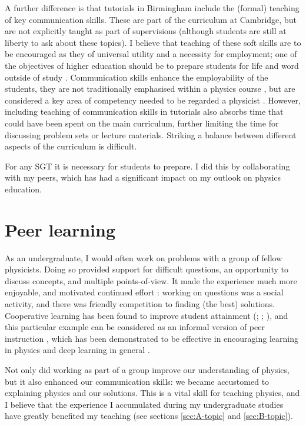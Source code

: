 A further difference is that tutorials in Birmingham include the (formal) teaching of key communication skills. These are part of the curriculum at Cambridge, but are not explicitly taught as part of supervisions (although students are still at liberty to ask about these topics). I believe that teaching of these soft skills are to be encouraged as they of universal utility and a necessity for employment; one of the objectives of higher education should be to prepare students for life and word outside of study \citep{Fallows2000,Harvey2000}. Communication skills enhance the employability of the students, they are not traditionally emphasised within a physics course \citep[cf.][]{Sharma2007}, but are considered a key area of competency needed to be regarded a physicist \citep{Gonsalves2014a}. However, including teaching of communication skills in tutorials also absorbs time that could have been spent on the main curriculum, further limiting the time for discussing problem sets or lecture materials. Striking a balance between different aspects of the curriculum is difficult.

For any SGT it is necessary for students to prepare. I did this by collaborating with my peers, which has had a significant impact on my outlook on physics education.

\section{Peer learning}\label{sec:peer}

As an undergraduate, I would often work on problems with a group of fellow physicists. Doing so provided support for difficult questions, an opportunity to discuss concepts, and multiple points-of-view. It made the experience much more enjoyable, and motivated continued effort \citep[e.g.,][chapter 1]{Roth1994,Springer1999,Falchikov2001}: working on questions was a social activity, and there was friendly competition to finding (the best) solutions. Cooperative learning has been found to improve student attainment (\citealt{Qin1995}; \citealt[chapter 2]{Falchikov2001}; \citealt{Cabrera2002}), and this particular example can be considered as an informal version of peer instruction \citep{Roth1994}, which has been demonstrated to be effective in encouraging learning in physics \citep{Springer1999,Crouch2001,Pilzer2001,Miller2006} and deep learning in general \citep{Marton1976,Wilson2010}.

Not only did working as part of a group improve our understanding of physics, but it also enhanced our communication skills: we became accustomed to explaining physics and our solutions. This is a vital skill for teaching physics, and I believe that the experience I accumulated during my undergraduate studies have greatly benefited my teaching (see sections \ref{sec:A-topic} and \ref{sec:B-topic}).

